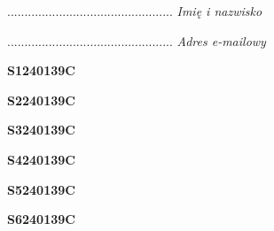 \begin{turn}{90}\begin{minipage}{\linewidth} \vspace{20mm} ................................................  \textit{Imię i nazwisko}\end{minipage}\end{turn}

\begin{turn}{90}\begin{minipage}{\linewidth} \vspace{20mm} ................................................  \textit{Adres e-mailowy}\end{minipage}\end{turn}

\begin{turn}{90}\huge \begin{minipage}{\linewidth} \vspace{10mm}\textbf{S1240139C}\end{minipage}\end{turn}

\begin{turn}{90}\huge \begin{minipage}{\linewidth} \vspace{10mm}\textbf{S2240139C}\end{minipage}\end{turn}

\begin{turn}{90}\huge \begin{minipage}{\linewidth} \vspace{10mm}\textbf{S3240139C}\end{minipage}\end{turn}

\begin{turn}{90}\huge \begin{minipage}{\linewidth} \vspace{10mm}\textbf{S4240139C}\end{minipage}\end{turn}

\begin{turn}{90}\huge \begin{minipage}{\linewidth} \vspace{10mm}\textbf{S5240139C}\end{minipage}\end{turn}

\begin{turn}{90}\huge \begin{minipage}{\linewidth} \vspace{10mm}\textbf{S6240139C}\end{minipage}\end{turn}

